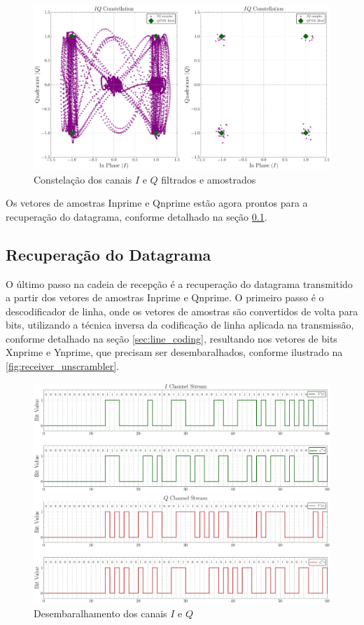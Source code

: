 \begin{figure}[H]
	\centering
	\caption{Constelação dos canais $I$ e $Q$ filtrados e amostrados}\label{fig:receiver_const}
	\includegraphics[width=\linewidth]{assets/cap3/receiver_sampler_const.pdf}
\end{figure}

Os vetores de amostras \gls{Inprime} e \gls{Qnprime} estão agora prontos para a recuperação do datagrama, conforme detalhado na seção \ref{sec:decodificacao_convolucional}.

\subsection{Recuperação do Datagrama}\label{sec:decodificacao_convolucional}

O último passo na cadeia de recepção é a recuperação do datagrama transmitido a partir dos vetores de amostras \gls{Inprime} e \gls{Qnprime}. O primeiro passo é o descodificador de linha, onde os vetores de amostras são convertidos de volta para bits, utilizando a técnica inversa da codificação de linha aplicada na transmissão, conforme detalhado na seção \ref{sec:line_coding}, resultando nos vetores de bits \gls{Xnprime} e \gls{Ynprime}, que precisam ser desembaralhados, conforme ilustrado na \autoref{fig:receiver_unscrambler}.

\begin{figure}[H]
	\centering
	\caption{Desembaralhamento dos canais $I$ e $Q$}\label{fig:receiver_unscrambler}
	\includegraphics[width=\linewidth]{assets/cap3/receiver_descrambler_time.pdf}
\end{figure}

